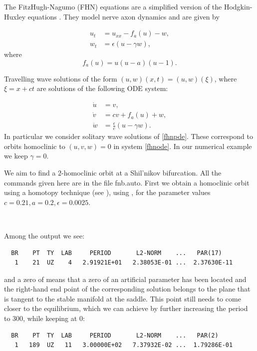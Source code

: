 \documentclass[12pt]{report}
\begin{document}
The FitzHugh-Nagumo (FHN) equations \cite{FitzH:61,NaArYo:62} 
are a simplified version of the
Hodgkin-Huxley equations \cite{HoHu:52}. 
They model nerve axon dynamics and are given by

\begin{equation}
\begin{split}
u_t&=u_{xx}-f_a(u)-w, \\
w_t&=\epsilon(u-\gamma w),
\end{split}
\label{fhnpde}
\end{equation}
where
\[
f_a(u) = u (u-a)(u-1).
\]

Travelling wave solutions of the form $(u,w)(x,t)=(u,w)(\xi)$, where
$\xi=x+ct$ are solutions of the following ODE system:

\begin{equation}
\begin{split}
\dot u &= v,\\
\dot v &= c v + f_a(u) + w,\\
\dot w &= \frac{\epsilon}{c} (u - \gamma w).
\end{split}
\label{fhnode}
\end{equation}
In particular we consider solitary wave solutions of \eqref{fhnpde}.
These correspond to orbits homoclinic to $(u,v,w)=0$ in system \eqref{fhnode}.
In our numerical example we keep $\gamma=0$.

We aim to find a $2$-homoclinic orbit at a Shil'nikov bifurcation.
All the commands given here are in the file fnb.auto.
First we obtain a homoclinic orbit using a homotopy technique (see
), using , for the parameter 
values $c=0.21, a=0.2, \epsilon=0.0025$.

\begin{center}
\\
\end{center}

Among the output we see:
\begin{verbatim}
  BR    PT  TY  LAB     PERIOD       L2-NORM    ...   PAR(17)
   1    21  UZ    4   2.91921E+01   2.38053E-01 ...  2.37630E-11
\end{verbatim}
and a zero of  means that a zero of an artificial parameter has
been located and the right-hand end point of the corresponding
solution belongs to the plane that is tangent to the stable manifold
at the saddle. This point still needs to come closer to the
equilibrium, which we can achieve by further increasing the period to
300, while keeping  at 0:
\begin{center}
\end{center}
\begin{verbatim}
  BR    PT  TY  LAB     PERIOD       L2-NORM    ...   PAR(2)
   1   189  UZ   11   3.00000E+02   7.37932E-02 ...  1.79286E-01
\end{verbatim}
\end{document}
